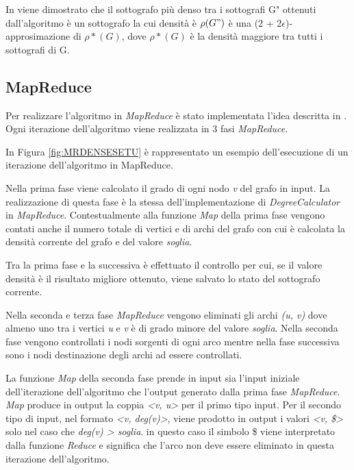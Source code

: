 \documentclass[LaM,binding=0.6cm]{sapthesis}
\begin{document}
In \cite{Bahmani:2012:DSS:2140436.2140442} viene dimostrato che il sottografo più denso tra i sottografi G" ottenuti dall'algoritmo è un sottografo la cui densità è $\rho(G")$ è una  (2 + 2$\epsilon$)-approsimazione di $\rho*(G)$, dove $\rho*(G)$ è la densità maggiore tra tutti i sottografi di G.

\begin{minipage}{\linewidth}

\end{minipage}

\subsection{MapReduce}

Per realizzare l'algoritmo in \textit{MapReduce} è stato implementata l'idea descritta in \cite{Bahmani:2012:DSS:2140436.2140442}. Ogni iterazione dell'algoritmo viene realizzata in 3 fasi \textit{MapReduce}.


In Figura \ref{fig:MRDENSESETU} è rappresentato un esempio dell'esecuzione di un iterazione dell'algoritmo in MapReduce.

Nella prima fase viene calcolato il grado di ogni nodo \textit{v} del grafo in input. La realizzazione di questa fase è la stessa dell'implementazione di \textit{DegreeCalculator} in \textit{MapReduce}. Contestualmente alla funzione \textit{Map} della prima fase vengono contati anche il numero totale di vertici e di archi del grafo con cui è calcolata la densità corrente del grafo e del valore \textit{soglia}. 

Tra la prima fase e la successiva è effettuato il controllo  per cui, se il valore densità è il risultato migliore ottenuto, viene salvato lo stato del sottografo corrente.

Nella seconda e terza fase \textit{MapReduce} vengono eliminati gli archi \textit{(u, v)} dove almeno uno tra i vertici \textit{u} e \textit{v} è di grado minore del valore \textit{soglia}. 
Nella seconda fase vengono controllati i nodi sorgenti di ogni arco mentre nella fase successiva sono i nodi destinazione degli archi ad essere controllati.

La funzione \textit{Map} della seconda fase prende in input sia l'input iniziale dell'iterazione dell'algoritmo che l'output generato dalla prima fase \textit{MapReduce}.
\textit{Map} produce in output la coppia \textit{<v, u>} per il primo tipo input. Per il secondo tipo di input, nel formato \textit{<v, deg(v)>}, viene prodotto in output i valori \textit{<v, \$>} solo nel caso che \textit{deg(v) > soglia}. in questo caso il simbolo \$ viene interpretato dalla funzione \textit{Reduce} e significa che l'arco non deve essere eliminato in questa iterazione dell'algoritmo.
\end{document}

